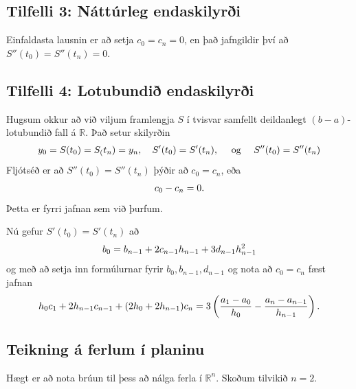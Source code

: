 \documentclass[A4paper,10pt,icelandic]{sphinxmanual}
\begin{document}
\subsection{Tilfelli 3: Náttúrleg endaskilyrði}
\label{kafli03:tilfelli-3-natturleg-endaskilyri}
Einfaldasta lausnin er að setja \(c_0 = c_n = 0\), en það jafngildir
því að \(S''(t_0) = S''(t_n) = 0\).


\subsection{Tilfelli 4: Lotubundið endaskilyrði}
\label{kafli03:tilfelli-4-lotubundi-endaskilyri}
Hugsum okkur að við viljum framlengja \(S\) í tvisvar samfellt
deildanlegt \((b-a)\)-lotubundið fall á \({{\mathbb  R}}\). Það
setur skilyrðin
\begin{gather}
\begin{split}y_0 = S(t_0) = S_(t_n) = y_n, \quad
    S'(t_0) = S'(t_n), \quad
    \text{ og } \quad
    S''(t_0) = S''(t_n)\end{split}\notag
\end{gather}
Fljótséð er að \(S''(t_0) = S''(t_n)\) þýðir að \(c_0 = c_n\),
eða
\begin{gather}
\begin{split}c_0 - c_n = 0.\end{split}\notag
\end{gather}
Þetta er fyrri jafnan sem við þurfum.

Nú gefur \(S'(t_0) = S'(t_n)\) að
\begin{gather}
\begin{split}b_0 = b_{n-1} + 2c_{n-1}h_{n-1} + 3d_{n-1}h_{n-1}^2\end{split}\notag
\end{gather}
og með að setja inn formúlurnar fyrir \(b_0, b_{n-1}, d_{n-1}\) og
nota að \(c_0 = c_n\) fæst jafnan
\begin{gather}
\begin{split}h_0c_1 + 2h_{n-1}c_{n-1} + (2h_0 + 2h_{n-1})c_n
    = 3 \left( \frac{a_1-a_0}{h_0}
        - \frac{a_n-a_{n-1}}{h_{n-1}} \right).\end{split}\notag
\end{gather}

\subsection{Teikning á ferlum í planinu}
\label{kafli03:index-22}\label{kafli03:teikning-a-ferlum-i-planinu}
Hægt er að nota brúun til þess að nálga ferla í \(\mathbb R^n\).
Skoðum tilvikið \(n=2\).
\end{document}
